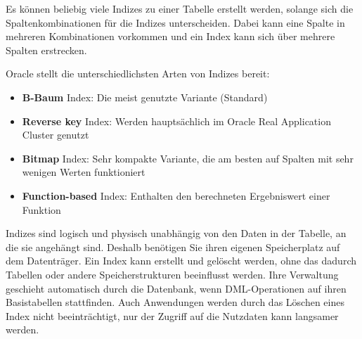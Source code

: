       Es können beliebig viele Indizes zu einer Tabelle erstellt werden, solange sich die Spaltenkombinationen für die Indizes unterscheiden. Dabei kann eine Spalte in mehreren Kombinationen vorkommen und ein Index kann sich über mehrere Spalten erstrecken.

      Oracle stellt die unterschiedlichsten Arten von Indizes bereit:
      \begin{itemize}
        \item \textbf{B-Baum} Index: Die meist genutzte Variante (Standard)
        \item \textbf{Reverse key} Index: Werden hauptsächlich im Oracle Real Application Cluster genutzt
        \item \textbf{Bitmap} Index: Sehr kompakte Variante, die am besten auf Spalten mit sehr wenigen Werten funktioniert
        \item \textbf{Function-based} Index: Enthalten den berechneten Ergebniswert einer Funktion
      \end{itemize}
\clearpage
      Indizes sind logisch und physisch unabhängig von den Daten in der Tabelle, an die sie angehängt sind. Deshalb benötigen Sie ihren eigenen Speicherplatz auf dem Datenträger. Ein Index kann erstellt und gelöscht werden, ohne das dadurch Tabellen oder andere Speicherstrukturen beeinflusst werden. Ihre Verwaltung geschieht automatisch durch die Datenbank, wenn DML-Operationen auf ihren Basistabellen stattfinden. Auch Anwendungen werden durch das Löschen eines Index nicht beeinträchtigt, nur der Zugriff auf die Nutzdaten kann  langsamer werden.
